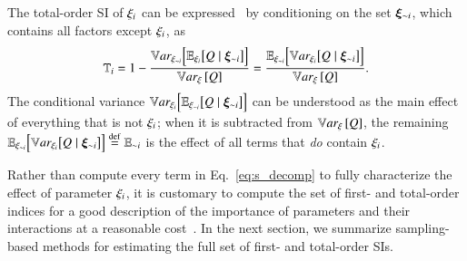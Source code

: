 The total-order SI of $\xi_{i}$ can be expressed~\cite{homma-saltelli-1996, saltelli-2002} by conditioning on the set $\bm{\xi}_{\sim i}$, which contains all factors except $\xi_{i}$, as
\begin{equation} \label{eq:ti}
    \mathbb{T}_{i} = 1 - \frac{\mathbb{V}ar_{\xi_{\sim i}} \Bigl[ \mathbb{E}_{\xi_{i}}\bigl[ Q \mid \bm{\xi}_{\sim i} \bigr] \Bigr]}{\mathbb{V}ar_{\xi}\left[Q\right]} = \frac{\mathbb{E}_{\xi_{\sim i}} \Bigl[ \mathbb{V}ar_{\xi_{i}} \bigl[ Q \mid \bm{\xi}_{\sim i} \bigr] \Bigr]}{\mathbb{V}ar_{\xi}\left[Q\right]} .
\end{equation}
The conditional variance $\mathbb{V}ar_{\xi_{i}} \Bigl[ \mathbb{E}_{\xi_{\sim i}}\bigl[ Q \mid \bm{\xi}_{\sim i} \bigr] \Bigr]$ can be understood as the main effect of everything that is not $\xi_{i}$; when it is subtracted from $\mathbb{V}ar_{\xi}\left[Q\right]$, the remaining $\mathbb{E}_{\xi_{\sim i}} \Bigl[ \mathbb{V}ar_{\xi_{i}} \bigl[ Q \mid \bm{\xi}_{\sim i} \bigr] \Bigr] \overset{\operatorname{def}}{=} \mathbb{E}_{{\sim i}}$ is the effect of all terms that \emph{do} contain $\xi_{i}$. 

Rather than compute every term in Eq.~\eqref{eq:s_decomp} to fully characterize the effect of parameter $\xi_{i}$, it is customary to compute the set of first- and total-order indices for a good description of the importance of parameters and their interactions at a reasonable cost~\cite{saltelli-etal-2008}.
In the next section, we summarize sampling-based methods for estimating the full set of first- and total-order SIs. 
